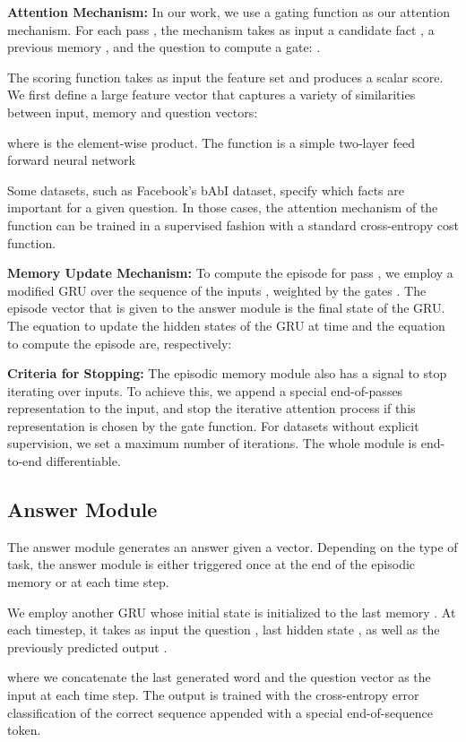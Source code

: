 \documentclass{article}
\begin{document}
\textbf{Attention Mechanism:}
In our work, we use a gating function as our attention mechanism. For each pass , the mechanism takes as input a candidate fact , a previous memory , and the question  to compute a gate: . 

The scoring function  takes as input the feature set  and produces a scalar score. We first define a large feature vector that captures a variety of similarities between input, memory and question vectors:  

where  is the element-wise product. The function  is a simple two-layer feed forward neural network 


Some datasets, such as Facebook's bAbI dataset, specify which facts are important for a given question. In those cases, the attention mechanism of the  function can be trained in a supervised fashion with a standard cross-entropy cost function. 

\textbf{Memory Update Mechanism:} To compute the episode for pass , we employ a modified GRU over the sequence of the inputs , weighted by the gates . The episode vector that is given to the answer module is the final state of the GRU. The equation to update the hidden states of the GRU at time  and the equation to compute the episode are, respectively:



\textbf{Criteria for Stopping:} The episodic memory module also has a signal to stop iterating over inputs. To achieve this, we append a special end-of-passes representation to the input, and stop the iterative attention process if this representation is chosen by the gate function. For datasets without explicit supervision, we set a maximum number of iterations. The whole module is end-to-end differentiable.


\subsection{Answer Module}\label{section:answer}
The answer module generates an answer given a vector. Depending on the type of task, the answer module is either triggered once at the end of the episodic memory or at each time step.


We employ another GRU whose initial state is initialized to the last memory . At each timestep, it takes as input the question , last hidden state , as well as the previously predicted output . 

where we concatenate the last generated word and the question vector as the input at each time step.
The output is trained with the cross-entropy error classification of the correct sequence appended with a special end-of-sequence token. 
\end{document}
